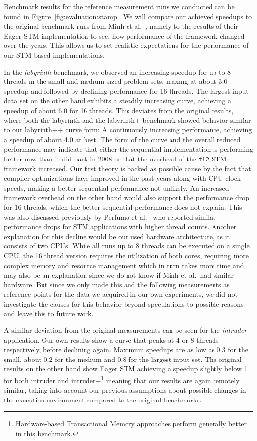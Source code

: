Benchmark results for the reference measurement runs we conducted can be found in Figure~\ref{fig:evaluation:stamp}.
We will compare our achieved speedups to the original benchmark runs from Minh et al.~\cite{minh2008stamp}, namely to the results of their Eager STM implementation to see, how performance of the framework changed over the years.
This allows us to set realistic expectations for the performance of our STM-based implementations.

In the \emph{labyrinth} benchmark, we observed an increasing speedup for up to 8 threads in the small and medium sized problem sets, maxing at about 3.0 speedup and followed by declining performance for 16 threads.
The largest input data set on the other hand exhibits a steadily increasing curve, achieving a speedup of about 6.0 for 16 threads.
This deviates from the original results, where both the labyrinth and the labyrinth+ benchmark showed behavior similar to our labyrinth++ curve form: A continuously increasing performance, achieving a speedup of about 4.0 at best.
The form of the curve and the overall reduced performance may indicate that either the sequential implementation is performing better now than it did back in 2008 or that the overhead of the \texttt{tl2} STM framework increased.
Our first theory is backed as possible cause by the fact that compiler optimizations have improved in the past years along with CPU clock speeds, making a better sequential performance not unlikely.
An increased framework overhead on the other hand would also support the performance drop for 16 threads, which the better sequential performance does not explain.
This was also discussed previously by Perfumo et al.~\cite{perfumo2008limits} who reported similar performance drops for STM applications with higher thread counts.
Another explanation for this decline would be our used hardware architecture, as it consists of two CPUs.
While all runs up to 8 threads can be executed on a single CPU, the 16 thread version requires the utilization of both cores, requiring more complex memory and resource management which in turn takes more time and may also be an explanation since we do not know if Minh et al.\ had similar hardware.
But since we only made this and the following measurements as reference points for the data we acquired in our own experiments, we did not investigate the causes for this behavior beyond speculations to possible reasons and leave this to future work.

A similar deviation from the original measurements can be seen for the \emph{intruder} application.
Our own results show a curve that peaks at 4 or 8 threads respectively, before declining again.
Maximum speedups are as low as 0.3 for the small, about 0.2 for the medium and 0.8 for the largest input set.
The original results on the other hand show Eager STM achieving a speedup slightly below 1 for both intruder and intruder+\footnote{Hardware-based Transactional Memory approaches perform generally better in this benchmark.} meaning that our results are again remotely similar, taking into account our previous assumptions about possible changes in the execution environment compared to the original benchmarks.

